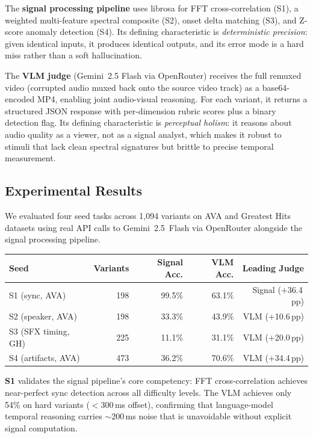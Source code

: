 \documentclass[11pt]{article}
\begin{document}
The \textbf{signal processing pipeline} uses librosa for FFT cross-correlation (S1), a
weighted multi-feature spectral composite (S2), onset delta matching (S3), and Z-score
anomaly detection (S4). Its defining characteristic is \emph{deterministic precision}: given
identical inputs, it produces identical outputs, and its error mode is a hard miss rather
than a soft hallucination.

The \textbf{VLM judge} (Gemini~2.5 Flash via OpenRouter) receives the full remuxed video
(corrupted audio muxed back onto the source video track) as a base64-encoded MP4, enabling
joint audio-visual reasoning. For each variant, it returns a structured JSON response with
per-dimension rubric scores plus a binary detection flag. Its defining characteristic is
\emph{perceptual holism}: it reasons about audio quality as a viewer, not as a signal
analyst, which makes it robust to stimuli that lack clean spectral signatures but brittle
to precise temporal measurement.

\subsection{Experimental Results}

We evaluated four seed tasks across 1,094 variants on AVA \cite{gu2018ava} and Greatest
Hits \cite{owens2016visually} datasets using real API calls to Gemini~2.5~Flash via
OpenRouter alongside the signal processing pipeline.

\begin{center}
\begin{tabular}{lrrrr}
\toprule
Seed & Variants & Signal Acc. & VLM Acc. & Leading Judge \\
\midrule
S1 (sync, AVA)          & 198 & 99.5\% & 63.1\% & Signal ($+$36.4\,pp) \\
S2 (speaker, AVA)       & 198 & 33.3\% & 43.9\% & VLM ($+$10.6\,pp) \\
S3 (SFX timing, GH)     & 225 & 11.1\% & 31.1\% & VLM ($+$20.0\,pp) \\
S4 (artifacts, AVA)     & 473 & 36.2\% & 70.6\% & VLM ($+$34.4\,pp) \\
\bottomrule
\end{tabular}
\end{center}

\textbf{S1} validates the signal pipeline's core competency: FFT cross-correlation achieves
near-perfect sync detection across all difficulty levels. The VLM achieves only 54\% on hard
variants ($<$300\,ms offset), confirming that language-model temporal reasoning carries
$\sim$200\,ms noise that is unavoidable without explicit signal computation.
\end{document}
